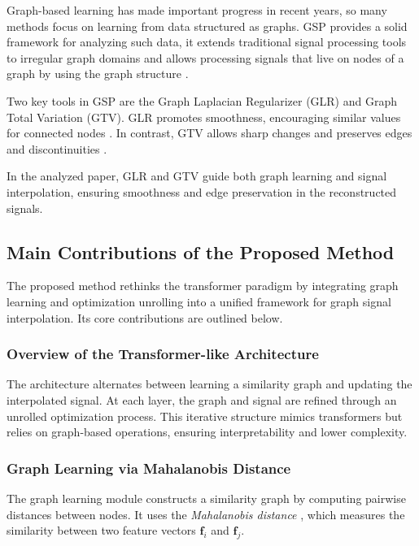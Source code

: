\documentclass{article}
\theoremstyle{plain}
\theoremstyle{definition}
\theoremstyle{remark}
\begin{document}
Graph-based learning has made important progress in recent years, so many methods focus on learning from data structured as graphs. GSP provides a solid framework for analyzing such data, it extends traditional signal processing tools to irregular graph domains and allows processing signals that live on nodes of a graph by using the graph structure \cite{shuman2013emerging}.

Two key tools in GSP are the Graph Laplacian Regularizer (GLR) and Graph Total Variation (GTV). GLR promotes smoothness, encouraging similar values for connected nodes \cite{ortega2018graph}. In contrast, GTV allows sharp changes and preserves edges and discontinuities \cite{cheung2018graph}.

In the analyzed paper, GLR and GTV guide both graph learning and signal interpolation, ensuring smoothness and edge preservation in the reconstructed signals.

\subsection{Main Contributions of the Proposed Method}

The proposed method rethinks the transformer paradigm by integrating graph learning and optimization unrolling into a unified framework for graph signal interpolation. Its core contributions are outlined below.

\subsubsection{Overview of the Transformer-like Architecture}

The architecture alternates between learning a similarity graph and updating the interpolated signal. At each layer, the graph and signal are refined through an unrolled optimization process. This iterative structure mimics transformers but relies on graph-based operations, ensuring interpretability and lower complexity.

\subsubsection{Graph Learning via Mahalanobis Distance}

The graph learning module constructs a similarity graph by computing pairwise distances between nodes. It uses the \textit{Mahalanobis distance} \cite{hu2020feature}, which measures the similarity between two feature vectors $\mathbf{f}_i$ and $\mathbf{f}_j$.
\end{document}
